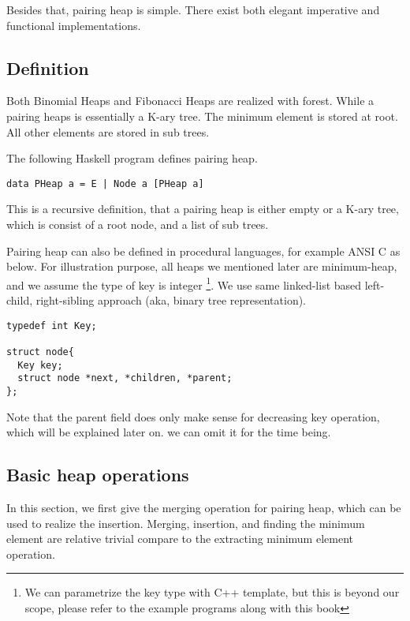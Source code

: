 \documentclass{article}
\begin{document}
Besides that, pairing heap is simple. There exist both elegant
imperative and functional implementations.

\subsection{Definition}

Both Binomial Heaps and Fibonacci Heaps are realized with forest.
While a pairing heaps is essentially a K-ary tree. The minimum element
is stored at root. All other elements are stored in sub trees.

The following Haskell program defines pairing heap.

\lstset{language=Haskell}
\begin{lstlisting}
data PHeap a = E | Node a [PHeap a]
\end{lstlisting}

This is a recursive definition, that a pairing heap is either empty
or a K-ary tree, which is consist of a root node, and a list of sub trees.

Pairing heap can also be defined in procedural languages, for example
ANSI C as below. For illustration purpose, all heaps we mentioned later
are minimum-heap, and we assume the type of key is integer \footnote{We
can parametrize the key type with C++ template, but this is beyond
our scope, please refer to the example programs along with
this book}. We use same linked-list based left-child, right-sibling
approach (aka, binary tree representation\cite{CLRS}).

\lstset{language=C}
\begin{lstlisting}
typedef int Key;

struct node{
  Key key;
  struct node *next, *children, *parent;
};
\end{lstlisting}

Note that the parent field does only make sense for decreasing key
operation, which will be explained later on. we can omit it for the
time being.


\subsection{Basic heap operations}
In this section, we first give the merging operation for pairing
heap, which can be used to realize the insertion. Merging, insertion,
and finding the minimum element are relative trivial compare to
the extracting minimum element operation.
\end{document}
